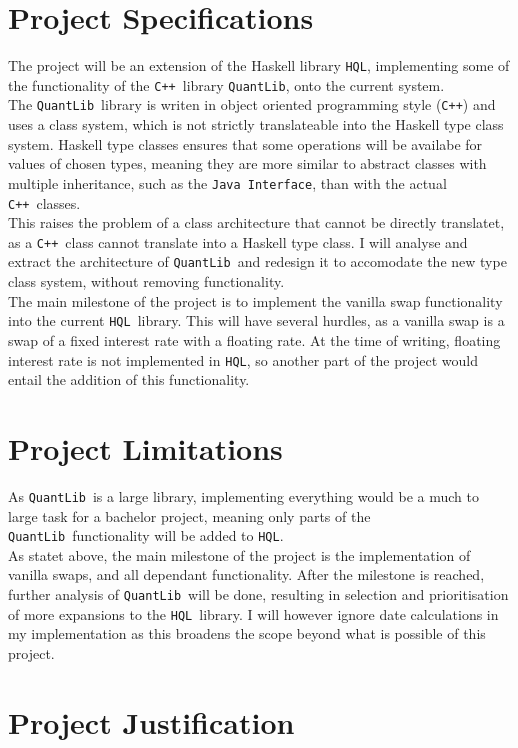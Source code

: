 \documentclass{article}
\newcommand{\HQL}{\texttt{HQL}}
\newcommand{\QL}{\texttt{QuantLib}}
\newcommand{\Cpp}{\texttt{C++}}
\theoremstyle{definition}
\begin{document}
\section{Project Specifications}
The project will be an extension of the Haskell library \HQL, implementing 
some of the functionality of the \Cpp\ library \QL\cite{QULI}, onto the current system.\\
The \QL\ library is writen in object oriented programming style (\Cpp) and uses a class system, 
which is not strictly translateable into the Haskell type class system.
Haskell type classes ensures that some operations will be availabe for values of chosen types, meaning they are
more similar to abstract classes with multiple inheritance, such as the \texttt{Java Interface}, 
than with the actual \Cpp\ classes. \\
This raises the problem of a class architecture that cannot be directly translatet, as a \Cpp\ class cannot translate
into a Haskell type class. I will analyse and extract the architecture of \QL\ and redesign it to accomodate
the new type class system, without removing functionality.\\
The main milestone of the project is to implement the vanilla swap functionality into the
current \HQL\ library. This will have several hurdles, as a vanilla swap is a swap of a fixed interest
rate with a floating rate. At the time of writing, floating interest rate is not implemented in \HQL, so 
another part of the project would entail the addition of this functionality. \\

\section{Project Limitations}
As \QL\ is a large library, implementing everything would be a much to large task
for a bachelor project, meaning only parts of the \QL\ functionality will be added to \HQL.\\
As statet above, the main milestone of the project is the implementation of vanilla swaps, and
all dependant functionality. After the milestone is reached, further analysis 
of \QL\ will be done, resulting in selection and prioritisation of more expansions to the \HQL\ library.
I will however ignore date calculations in my implementation as this broadens the scope beyond what is 
possible of this project. 

\section{Project Justification}
\end{document}
